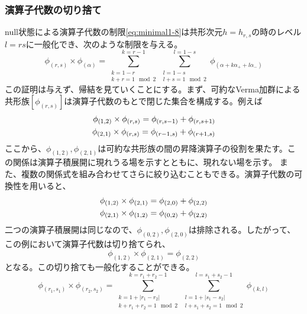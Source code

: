 \documentclass[11pt, aps, longbibliography]{article}
\numberwithin{equation}{section}
\begin{document}
        \subsubsection{演算子代数の切り捨て}
        null状態による演算子代数の制限\eqref{eq:minimal1-8}は共形次元$h=h_{r,s}$の時のレベル$l=rs$に一般化でき、次のような制限を与える。
        \begin{equation}\label{eq:minimal2-1}
            \phi_{(r,s)} \times \phi_{(\alpha)} = \sum_{\substack{k=1-r \\ k+r=1 \mod 2}}^{k=r-1} \sum_{\substack{l=1-s \\ l+s=1 \mod 2}}^{l=1-s} \phi_{(\alpha  + k\alpha_+ + l\alpha_-)}
        \end{equation}
        この証明は与えず、帰結を見ていくことにする。まず、可約なVerma加群による共形族$[\phi_{(r,s)}]$は演算子代数のもとで閉じた集合を構成する。例えば
        \begin{align}\label{eq:minimal2-2}
            \phi_{(1,2)} \times \phi_{(r,s)} = \phi_{(r,s-1)} + \phi_{(r,s+1)} \\
            \phi_{(2,1)} \times \phi_{(r,s)} = \phi_{(r-1,s)} + \phi_{(r+1,s)} \notag 
        \end{align}
        ここから、$\phi_{(1,2)}, \phi_{(2,1)}$は可約な共形族の間の昇降演算子の役割を果たす。この関係は演算子積展開に現れうる場を示すとともに、現れない場を示す。
        また、複数の関係式を組み合わせてさらに絞り込むこともできる。演算子代数の可換性を用いると、
        \begin{align}\label{eq:minimal2-3}
            \phi_{(1,2)} \times \phi_{(2,1)} = \phi_{(2,0)} + \phi_{(2,2)} \\
            \phi_{(2,1)} \times \phi_{(1,2)} = \phi_{(0,2)} + \phi_{(2,2)} \notag
        \end{align}
        二つの演算子積展開は同じなので、$\phi_{(0,2)},\phi_{(2,0)}$は排除される。したがって、この例において演算子代数は切り捨てられ、
        \begin{equation}\label{eq:minimal2-4}
            \phi_{(1,2)} \times \phi_{(2,1)} = \phi_{(2,2)}
        \end{equation}
        となる。この切り捨ても一般化することができる。
        \begin{equation}\label{eq:minimal2-5}
            \phi_{(r_1,s_1)} \times \phi_{(r_2,s_2)} = \sum_{\substack{k=1+|r_1-r_2| \\ k+r_1+r_2=1 \mod 2}}^{k=r_1+r_2-1}\sum_{\substack{l=1+|s_1-s_2| \\ l+s_1+s_2=1 \mod 2}}^{l=s_1+s_2-1} \phi_{(k,l)}
        \end{equation}
\end{document}
